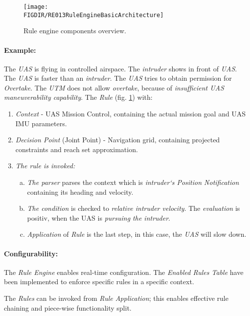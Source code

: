 \begin{figure}[H]
    \centering
    \texttt{[image: \\FIGDIR/RE013RuleEngineBasicArchitecture]}
    \caption{Rule engine components overview.}
    \label{fig:RuleEngineBasicArchitecture}
\end{figure}

\paragraph{Example:} The \emph{UAS} is flying in controlled airspace.  The \emph{intruder} shows in front of \emph{UAS}. The \emph{UAS} is faster than an \emph{intruder}. The \emph{UAS} tries to obtain permission for \emph{Overtake}. The \emph{UTM} does not allow \emph{overtake}, because of \emph{insufficient UAS maneuverability capability}. The \emph{Rule} (fig. \ref{fig:RuleEngineBasicArchitecture}) with:
\begin{enumerate}
    \item \emph{Context} - UAS Mission Control, containing the actual mission goal and UAS IMU parameters. 
    
    \item \emph{Decision Point} (Joint Point) - Navigation grid, containing projected constraints and reach set approximation.
    
    \item \emph{The rule is invoked:}
    \begin{enumerate}[a.]
        \item \emph{The parser} parses the context which is \emph{intruder`s Position Notification} containing its heading and velocity.
        
        \item \emph{The condition} is checked to \emph{relative intruder velocity}. The \emph{evaluation} is positiv, when the UAS is \emph{pursuing the intruder}.
        
        \item \emph{Application} of \emph{Rule} is the last step, in this case, the \emph{UAS} will slow down.
    \end{enumerate}
\end{enumerate}

\paragraph{Configurability:} The \emph{Rule Engine} enables real-time configuration. The \emph{Enabled Rules Table} have been implemented to enforce specific rules in a specific context. 

The \emph{Rules} can be invoked from \emph{Rule Application}; this enables effective rule chaining and piece-wise functionality split. 

